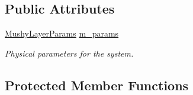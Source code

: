 \subsection*{Public Attributes}
\begin{DoxyCompactItemize}
\item 
\mbox{\label{class_phys_b_c_util_a1007b24a131e788c97781df04ae9037e}} 
\hyperlink{class_mushy_layer_params}{Mushy\+Layer\+Params} \hyperlink{class_phys_b_c_util_a1007b24a131e788c97781df04ae9037e}{m\+\_\+params}
\begin{DoxyCompactList}\small\item\em Physical parameters for the system. \end{DoxyCompactList}\end{DoxyCompactItemize}
\subsection*{Protected Member Functions}
